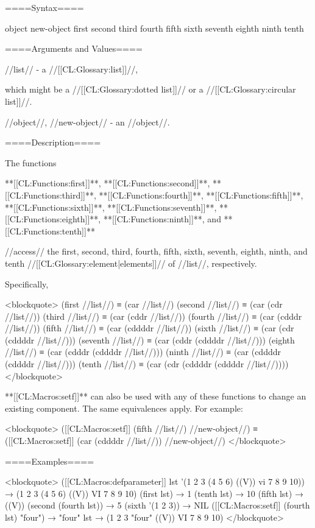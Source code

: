 
====Syntax====

 {object} {new-object} {first second third fourth fifth sixth seventh eighth ninth tenth}

====Arguments and Values====

//list// - a //[[CL:Glossary:list]]//,

which might be a //[[CL:Glossary:dotted list]]// or a //[[CL:Glossary:circular list]]//.

//object//, //new-object// - an //object//.

====Description====

The functions

**[[CL:Functions:first]]**, **[[CL:Functions:second]]**, **[[CL:Functions:third]]**, **[[CL:Functions:fourth]]**, **[[CL:Functions:fifth]]**, **[[CL:Functions:sixth]]**, **[[CL:Functions:seventh]]**, **[[CL:Functions:eighth]]**, **[[CL:Functions:ninth]]**, and **[[CL:Functions:tenth]]**

//access// the first, second, third, fourth, fifth, sixth, seventh, eighth, ninth, and tenth //[[CL:Glossary:element|elements]]// of //list//, respectively.

Specifically,

<blockquote> (first //list//) ≡ (car //list//) (second //list//) ≡ (car (cdr //list//)) (third //list//) ≡ (car (cddr //list//)) (fourth //list//) ≡ (car (cdddr //list//)) (fifth //list//) ≡ (car (cddddr //list//)) (sixth //list//) ≡ (car (cdr (cddddr //list//))) (seventh //list//) ≡ (car (cddr (cddddr //list//))) (eighth //list//) ≡ (car (cdddr (cddddr //list//))) (ninth //list//) ≡ (car (cddddr (cddddr //list//))) (tenth //list//) ≡ (car (cdr (cddddr (cddddr //list//)))) </blockquote>

**[[CL:Macros:setf]]** can also be used with any of these functions to change an existing component. The same equivalences apply. For example:

<blockquote> ([[CL:Macros:setf]] (fifth //list//) //new-object//) ≡ ([[CL:Macros:setf]] (car (cddddr //list//)) //new-object//) </blockquote>

====Examples====

<blockquote> ([[CL:Macros:defparameter]] lst '(1 2 3 (4 5 6) ((V)) vi 7 8 9 10)) → (1 2 3 (4 5 6) ((V)) VI 7 8 9 10) (first lst) → 1 (tenth lst) → 10 (fifth lst) → ((V)) (second (fourth lst)) → 5 (sixth '(1 2 3)) → NIL ([[CL:Macros:setf]] (fourth lst) "four") → "four" lst → (1 2 3 "four" ((V)) VI 7 8 9 10) </blockquote>

